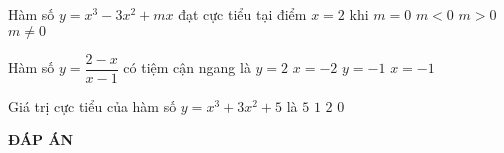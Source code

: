 \begin{ex}%
Hàm số $y=x^3-3x^2+mx$ đạt cực tiểu tại điểm $x=2$ khi
\choice
{\True $m=0$}
{$m<0$}
{$m>0$}
{$m \neq 0$}
\end{ex}

\begin{ex}%
Hàm số $y=\dfrac{2-x}{x-1}$ có tiệm cận ngang là
\choice
{$y=2$}
{$x=-2$}
{\True $y=-1$}
{$x=-1$}
\end{ex}

\begin{ex}%
Giá trị cực tiểu của hàm số $y=x^3+3x^2+5$ là
\choice
{\True $5$}
{$1$}
{$2$}
{$0$}
\end{ex}


\newpage
\begin{center}
	\textbf{ĐÁP ÁN}
\end{center}
\begin{multicols}{10}
	 
\end{multicols}

